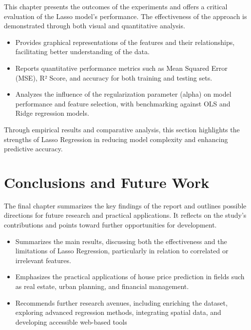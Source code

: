 \documentclass[12pt, a4paper]{report}
\begin{document}
This chapter presents the outcomes of the experiments and offers a critical evaluation of the Lasso model’s performance. The effectiveness of the approach is demonstrated through both visual and quantitative analysis.

\begin{itemize}
    \item Provides graphical representations of the features and their relationships, facilitating better understanding of the data.

 \item Reports quantitative performance metrics such as Mean Squared Error (MSE), R² Score, and accuracy for both training and testing sets.

 \item Analyzes the influence of the regularization parameter (alpha) on model performance and feature selection, with benchmarking against OLS and Ridge regression models.
\end{itemize}

Through empirical results and comparative analysis, this section highlights the strengths of Lasso Regression in reducing model complexity and enhancing predictive accuracy.

\section*{Conclusions and Future Work}

The final chapter summarizes the key findings of the report and outlines possible directions for future research and practical applications. It reflects on the study’s contributions and points toward further opportunities for development.
\begin{itemize}
    \item Summarizes the main results, discussing both the effectiveness and the limitations of Lasso Regression, particularly in relation to correlated or irrelevant features.

 \item Emphasizes the practical applications of house price prediction in fields such as real estate, urban planning, and financial management.

\item Recommends further research avenues, including enriching the dataset, exploring advanced regression methods, integrating spatial data, and developing accessible web-based tools
\end{itemize}
\end{document}
